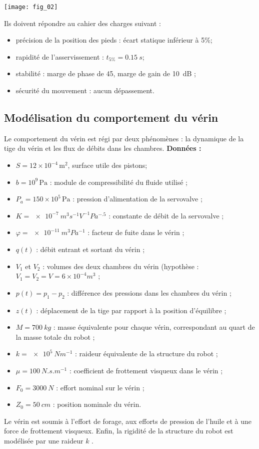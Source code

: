\begin{marginfigure}
\texttt{[image: fig\_02]}
\end{marginfigure}
Ils doivent répondre au cahier des charges suivant :
\begin{itemize}
\item précision de la position des pieds : écart statique inférieur à 5\%;
\item rapidité de l’asservissement : $t_{5\%} = \SI{0,15}{s}$;
\item stabilité : marge de phase de 45\degres, marge de gain de \SI{10}{dB} ;
\item sécurité du mouvement : aucun dépassement.
\end{itemize}

\subsection*{Modélisation du comportement du vérin}

Le comportement du vérin est régi par deux phénomènes : la dynamique de la tige du vérin et
les flux de débits dans les chambres.
\textbf{Données : }
\begin{itemize}
\item $S=12\times 10^{-4}\,\text{m}^2$, surface utile des pistons;
\item $ b = {10^9}\,\text{Pa}$ : module de compressibilité du fluide utilisé ;
\item $P_a = 150 \times 10^5\,\text{Pa}$ : pression d’alimentation de la servovalve ;
\item $K = \SI{e-7}{m^3s^{-1}V^{-1}Pa^{-.5}}$ : constante de débit de la servovalve ;
\item $\varphi = \SI{e-11}{m^3 Pa^{-1}}$ : facteur de fuite dans le vérin ;
\item $q(t )$ : débit entrant et sortant du vérin ;
\item $V_1$ et $V_2$ : volumes des deux chambres du vérin (hypothèse : $V_1 = V_2 = V = 6\times 10^{-4} \si{m^3}$ ;
\item $p(t ) = p_1 -p_2$ : différence des pressions dans les chambres du vérin ;
\item $z (t )$ : déplacement de la tige par rapport à la position d’équilibre ;
\item $M = \SI{700}{kg}$ : masse équivalente pour chaque vérin, correspondant au quart de la masse
totale du robot ;
\item $k = \SI{e5}{Nm^{-1}}$ : raideur équivalente de la structure du robot ;
\item $\mu = \SI{100}{N.s.m^{-1}}$ : coefficient de frottement visqueux dans le vérin ;
\item $F_0 = \SI{3000}{N}$ : effort nominal sur le vérin ;
\item $Z_0 = \SI{50}{cm}$ : position nominale du vérin.
\end{itemize}
Le vérin est soumis à l’effort de forage, aux efforts de pression de l’huile et à une force de
frottement visqueux. Enfin, la rigidité de la structure du robot est modélisée par une raideur $k$ .

